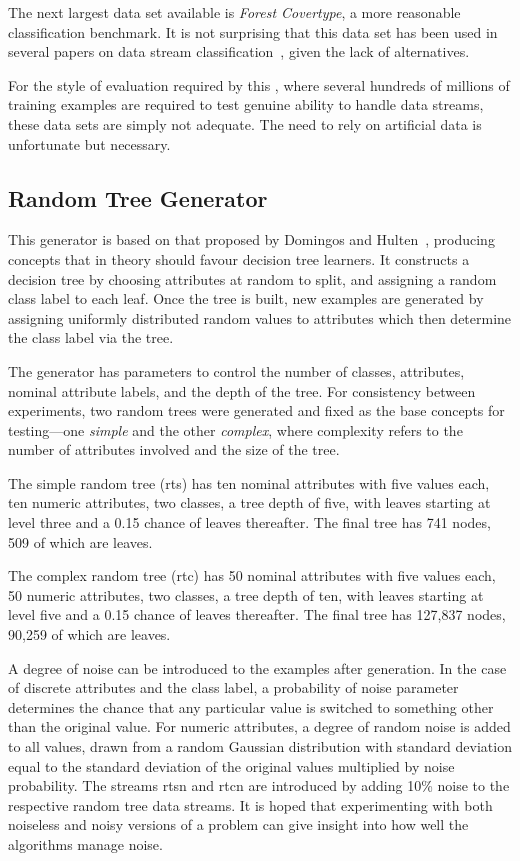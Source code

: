The next largest data set available is {\em Forest Covertype}, a more reasonable classification benchmark. It is not surprising that this data set has been used in several papers on data stream classification~\cite{vfdtc,ozaexp}, given the lack of alternatives.

For the style of evaluation required by this \thesisc, where several hundreds of millions of training examples are required to test genuine ability to handle data streams, these data sets are simply not adequate. The need to rely on artificial data is unfortunate but necessary.
\ENDOMIT

\subsection{Random Tree Generator}
\label{sec:randtrees}

This generator is based on that proposed by Domingos and Hulten~\cite{vfdt}, producing concepts that in theory should favour decision tree learners. It constructs a decision tree by choosing attributes at random to split, and assigning a random class label to each leaf. Once the tree is built, new examples are generated by assigning uniformly distributed random values to attributes which then determine the class label via the tree.

The generator has parameters to control the number of classes, attributes, nominal attribute labels, and the depth of the tree. For consistency between experiments, two random trees were generated and fixed as the base concepts for testing---one {\em simple} and the other {\em complex}, where complexity refers to the number of attributes involved and the size of the tree.

The simple random tree ({\sc rts}) has ten nominal attributes with five values each, ten numeric attributes, two classes, a tree depth of five, with leaves starting at level three and a 0.15 chance of leaves thereafter. The final tree has 741 nodes, 509 of which are leaves.

The complex random tree ({\sc rtc}) has 50 nominal attributes with five values each, 50 numeric attributes, two classes, a tree depth of ten, with leaves starting at level five and a 0.15 chance of leaves thereafter. The final tree has 127,837 nodes, 90,259 of which are leaves.

A degree of noise can be introduced to the examples after generation. In the case of discrete attributes and the class label, a probability of noise parameter determines the chance that any particular value is switched to something other than the original value. For numeric attributes, a degree of random noise is added to all values, drawn from a random Gaussian distribution with standard deviation equal to the standard deviation of the original values multiplied by noise probability.
The streams {\sc rtsn} and {\sc rtcn} are introduced by adding 10\% noise to the respective random tree data streams. It is hoped that experimenting with both noiseless and noisy versions of a problem can give insight into how well the algorithms manage noise.

